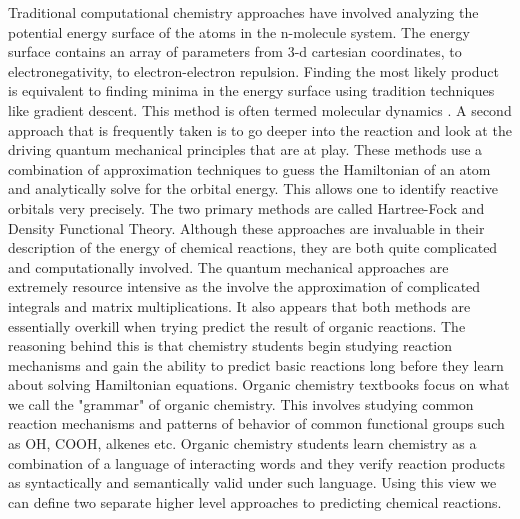 \documentclass[aps,floatfix,prd,showpacs]{revtex4}
\begin{document}
Traditional computational chemistry approaches have involved analyzing the potential energy surface of the atoms in the n-molecule system. The energy surface contains an array of parameters from 3-d cartesian coordinates, to electronegativity, to electron-electron repulsion. Finding the most likely product is equivalent to finding minima in the energy surface using tradition techniques like gradient descent. This method is often termed molecular dynamics . 
A second approach that is frequently taken is to go deeper into the reaction and look at the driving quantum mechanical principles that are at play. These methods use a combination of approximation techniques to guess the Hamiltonian of an atom and analytically solve for the orbital energy. This allows one to identify reactive orbitals very precisely. The two primary methods are called Hartree-Fock and Density Functional Theory. 
Although these approaches are invaluable in their description of the energy of chemical reactions, they are both quite complicated and computationally involved. The quantum mechanical approaches are extremely resource intensive as the involve the approximation of complicated integrals and matrix multiplications. It also appears that both methods are essentially overkill when trying predict the result of organic reactions. The reasoning behind this is that chemistry students begin studying reaction mechanisms and gain the ability to predict basic reactions long before they learn about solving Hamiltonian equations. Organic chemistry textbooks focus on what we call the "grammar" of organic chemistry. This involves  studying common reaction mechanisms and patterns of behavior of common functional groups such as OH, COOH, alkenes etc. Organic chemistry students learn chemistry as a combination of a language of interacting words and they verify reaction products as syntactically and semantically valid under such language. Using this view we can define two separate higher level approaches to predicting chemical reactions.
\end{document}

